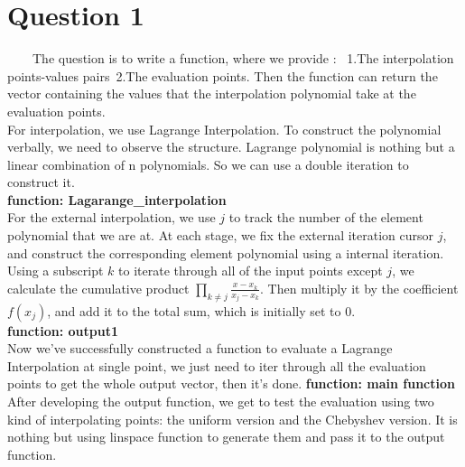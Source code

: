 \documentclass[a4paper]{article}
\begin{document}
\section{Question 1}
~~~~The question is to write a function, where we provide :~ 1.The interpolation points-values pairs~2.The evaluation points. Then the function can return the vector containing the values that the interpolation polynomial take at the evaluation points.\\
\indent For interpolation, we use Lagrange Interpolation. To construct the polynomial verbally, we need to observe the structure. Lagrange polynomial is nothing but a linear combination of n polynomials. So we can use a double iteration to construct it.\\
\textbf{function: Lagarange\_interpolation}\\
\indent For the external interpolation, we use $j$ to track the number of the element polynomial that we are at. At each stage, we fix the external iteration cursor $j$, and construct the corresponding element polynomial using a internal iteration. Using a subscript $k$ to iterate through all of the input points except $j$, we calculate the cumulative product $\prod_{k\neq j}\frac{x-x_k}{x_j-x_k}$. Then multiply it by the coefficient $f(x_j)$, and add it to the total sum, which is initially set to 0.\\
\textbf{function: output1}\\
\indent Now we've successfully constructed a function to evaluate a Lagrange Interpolation at single point, we just need to iter through all the evaluation points to get the whole output vector, then it's done.
\textbf{function: main function}\\
\indent After developing the output function, we get to test the evaluation using two kind of interpolating points: the uniform version and the Chebyshev version. It is nothing but using linspace function to generate them and pass it to the output function.
\end{document}
